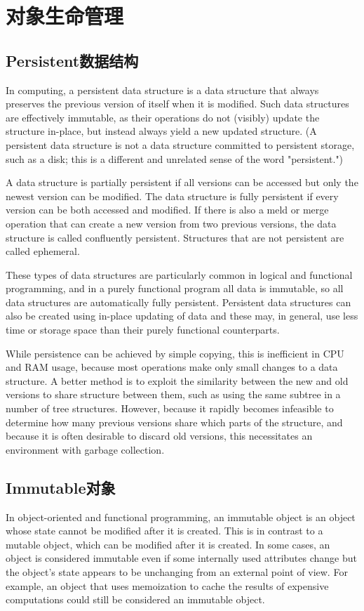 \section{对象生命管理}

\subsection{Persistent数据结构}
In computing, a persistent data structure is a data structure that always preserves the previous version of itself when it is modified. Such data structures are effectively immutable, as their operations do not (visibly) update the structure in-place, but instead always yield a new updated structure. (A persistent data structure is not a data structure committed to persistent storage, such as a disk; this is a different and unrelated sense of the word "persistent.")

A data structure is partially persistent if all versions can be accessed but only the newest version can be modified. The data structure is fully persistent if every version can be both accessed and modified. If there is also a meld or merge operation that can create a new version from two previous versions, the data structure is called confluently persistent. Structures that are not persistent are called ephemeral.

These types of data structures are particularly common in logical and functional programming, and in a purely functional program all data is immutable, so all data structures are automatically fully persistent. Persistent data structures can also be created using in-place updating of data and these may, in general, use less time or storage space than their purely functional counterparts.

While persistence can be achieved by simple copying, this is inefficient in CPU and RAM usage, because most operations make only small changes to a data structure. A better method is to exploit the similarity between the new and old versions to share structure between them, such as using the same subtree in a number of tree structures. However, because it rapidly becomes infeasible to determine how many previous versions share which parts of the structure, and because it is often desirable to discard old versions, this necessitates an environment with garbage collection.

\subsection{Immutable对象}
In object-oriented and functional programming, an immutable object is an object whose state cannot be modified after it is created. This is in contrast to a mutable object, which can be modified after it is created. In some cases, an object is considered immutable even if some internally used attributes change but the object's state appears to be unchanging from an external point of view. For example, an object that uses memoization to cache the results of expensive computations could still be considered an immutable object.

